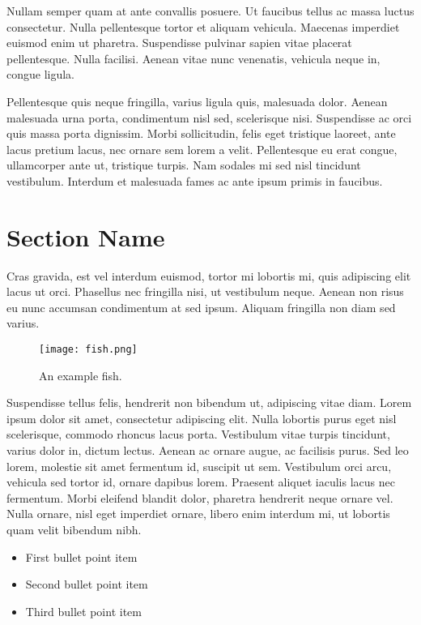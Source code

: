 \documentclass[
  UTF8, %
  12pt, %
]{essay} %
\begin{document}
Nullam semper quam at ante convallis posuere. Ut faucibus tellus ac massa luctus consectetur. Nulla pellentesque tortor et aliquam vehicula. Maecenas imperdiet euismod enim ut pharetra. Suspendisse pulvinar sapien vitae placerat pellentesque. Nulla facilisi. Aenean vitae nunc venenatis, vehicula neque in, congue ligula.

Pellentesque quis neque fringilla, varius ligula quis, malesuada dolor. Aenean malesuada urna porta, condimentum nisl sed, scelerisque nisi. Suspendisse ac orci quis massa porta dignissim. Morbi sollicitudin, felis eget tristique laoreet, ante lacus pretium lacus, nec ornare sem lorem a velit. Pellentesque eu erat congue, ullamcorper ante ut, tristique turpis. Nam sodales mi sed nisl tincidunt vestibulum. Interdum et malesuada fames ac ante ipsum primis in faucibus.


\section*{Section Name}

Cras gravida, est vel interdum euismod, tortor mi lobortis mi, quis adipiscing elit lacus ut orci. Phasellus nec fringilla nisi, ut vestibulum neque. Aenean non risus eu nunc accumsan condimentum at sed ipsum. Aliquam fringilla non diam sed varius.
\begin{wrapfigure}{l}{0.42\textwidth} %
  \texttt{[image: fish.png]}
  \caption{An example fish.}
\end{wrapfigure}
Suspendisse tellus felis, hendrerit non bibendum ut, adipiscing vitae diam. Lorem ipsum dolor sit amet, consectetur adipiscing elit. Nulla lobortis purus eget nisl scelerisque, commodo rhoncus lacus porta. Vestibulum vitae turpis tincidunt, varius dolor in, dictum lectus. Aenean ac ornare augue, ac facilisis purus. Sed leo lorem, molestie sit amet fermentum id, suscipit ut sem. Vestibulum orci arcu, vehicula sed tortor id, ornare dapibus lorem. Praesent aliquet iaculis lacus nec fermentum. Morbi eleifend blandit dolor, pharetra hendrerit neque ornare vel. Nulla ornare, nisl eget imperdiet ornare, libero enim interdum mi, ut lobortis quam velit bibendum nibh.

\begin{itemize}
  \item First bullet point item
  \item Second bullet point item
  \item Third bullet point item
\end{itemize}
\end{document}
